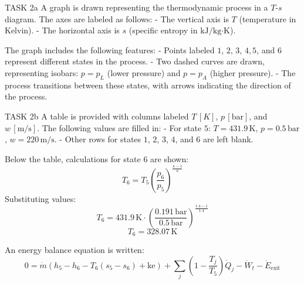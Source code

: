 TASK 2a  
A graph is drawn representing the thermodynamic process in a \( T \)-\( s \) diagram. The axes are labeled as follows:  
- The vertical axis is \( T \) (temperature in Kelvin).  
- The horizontal axis is \( s \) (specific entropy in \( \text{kJ/kg·K} \)).  

The graph includes the following features:  
- Points labeled \( 1 \), \( 2 \), \( 3 \), \( 4,5 \), and \( 6 \) represent different states in the process.  
- Two dashed curves are drawn, representing isobars: \( p = p_L \) (lower pressure) and \( p = p_A \) (higher pressure).  
- The process transitions between these states, with arrows indicating the direction of the process.  

TASK 2b  
A table is provided with columns labeled \( T \, [K] \), \( p \, [\text{bar}] \), and \( w \, [\text{m/s}] \). The following values are filled in:  
- For state \( 5 \): \( T = 431.9 \, \text{K} \), \( p = 0.5 \, \text{bar} \), \( w = 220 \, \text{m/s} \).  
- Other rows for states \( 1 \), \( 2 \), \( 3 \), \( 4 \), and \( 6 \) are left blank.  

Below the table, calculations for state \( 6 \) are shown:  
\[
T_6 = T_5 \left( \frac{p_6}{p_5} \right)^{\frac{\kappa - 1}{\kappa}}  
\]
Substituting values:  
\[
T_6 = 431.9 \, \text{K} \cdot \left( \frac{0.191 \, \text{bar}}{0.5 \, \text{bar}} \right)^{\frac{1.4 - 1}{1.4}}  
\]
\[
T_6 = 328.07 \, \text{K}  
\]

An energy balance equation is written:  
\[
0 = \dot{m} \left( h_5 - h_6 - T_6 (s_5 - s_6) + \text{ke} \right) + \sum_j \left( 1 - \frac{T_j}{T_5} \right) \dot{Q}_j - \dot{W}_t - \dot{E}_{\text{exit}}  
\]